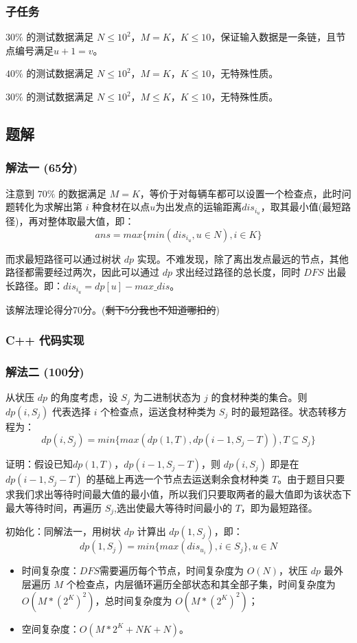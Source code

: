 \documentclass[UTF8, 12pt, a4paper, oneside]{ctexart}
\begin{document}
\subsubsection{子任务}
\par $30\%$ 的测试数据满足 $N \leq 10^2$，$M = K$，$K \leq 10$，保证输入数据是一条链，且节点编号满足$u + 1 = v$。
\par $40\%$ 的测试数据满足 $N \leq 10^2$，$M = K$，$K \leq 10$，无特殊性质。
\par $30\%$ 的测试数据满足 $N \leq 10^2$，$M \leq K$，$K \leq 10$，无特殊性质。
\subsection{题解}
\subsubsection{解法一 (65分)}
\par 注意到 $70\%$ 的数据满足 $M = K$，等价于对每辆车都可以设置一个检查点，此时问题转化为求解出第 $i$ 种食材在以点$u$为出发点的运输距离$dis_{i_u}$，取其最小值(最短路径)，再对整体取最大值，即：$$ans = max\{min(dis_{i_u}, u \in N), i \in K\}$$
\par 而求最短路径可以通过树状 $dp$ 实现。不难发现，除了离出发点最远的节点，其他路径都需要经过两次，因此可以通过 $dp$ 求出经过路径的总长度，同时 $DFS$ 出最长路径。即：$dis_{i_u} = dp[u] - max\_dis$。
\par 该解法理论得分70分。(\sout{剩下5分我也不知道哪扣的})
\subsubsection{C++ 代码实现}


\subsubsection{解法二 (100分)}
\par 从状压 $dp$ 的角度考虑，设 $S_j$ 为二进制状态为 $j$ 的食材种类的集合。则 $dp(i, S_j)$ 代表选择 $i$ 个检查点，运送食材种类为 $S_j$ 时的最短路径。状态转移方程为：$$dp(i, S_j) = min\{max(dp(1, T), dp(i - 1, S_j - T)), T \subseteq S_j\}$$
\par 证明：假设已知$dp(1, T)$，$dp(i - 1, S_j - T)$，则 $dp(i, S_j)$ 即是在 $dp(i - 1, S_j - T)$ 的基础上再选一个节点去运送剩余食材种类 $T$。由于题目只要求我们求出等待时间最大值的最小值，所以我们只要取两者的最大值即为该状态下最大等待时间，再遍历 $S_j$,选出使最大等待时间最小的 $T$，即为最短路径。
\par 初始化：同解法一，用树状 $dp$ 计算出 $dp(1, S_j)$，即： $$dp(1, S_j) = min\{max(dis_{u_i}), i \in S_j\}, u \in N$$
\begin{itemize}
    \item 时间复杂度：$DFS$需要遍历每个节点，时间复杂度为 $O(N)$，状压 $dp$ 最外层遍历 $M$ 个检查点，内层循环遍历全部状态和其全部子集，时间复杂度为 $O(M*(2^K)^2)$，总时间复杂度为 $O(M*(2^K)^2)$；
    \item 空间复杂度：$O(M*2^K + NK + N)$。
\end{itemize}
\end{document}
